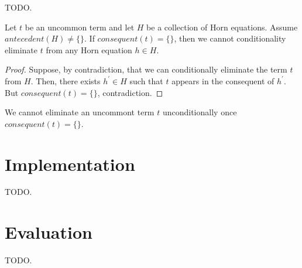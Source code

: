 TODO.

\begin{theorem}
  Let $t$ be an uncommon term and let $H$ be a collection of Horn equations.
  Assume $antecedent(H) \neq \{\}$. If $consequent(t) = \{\}$, then we cannot
  conditionality eliminate $t$ from any Horn equation $h \in H$. 
\end{theorem}

\begin{proof}
  Suppose, by contradiction, that we can conditionally eliminate the term
  $t$ from $H$. Then, there exists $h^{'} \in H$ such that $t$ appears in the
  consequent of $h^{'}$. But $consequent(t) = \{\}$, contradiction.
\end{proof}

\begin{corollary}
  We cannot eliminate an uncommont term $t$ unconditionally once
  $consequent(t) = \{\}$.
\end{corollary}

\section{Implementation}

TODO.

\section{Evaluation}

TODO.

